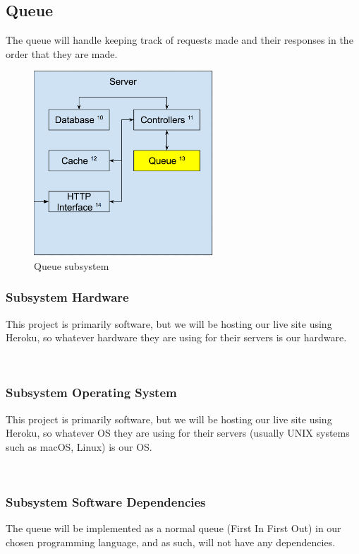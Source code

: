 \subsection{Queue}
The queue will handle keeping track of requests made and their responses in the order that they are made.

\begin{figure}[h!]
	\centering
 	\includegraphics[width=0.60\textwidth]{images/server/server_queue.png}
 	\caption{Queue subsystem}
\end{figure}

\newpage

\subsubsection{Subsystem Hardware}
This project is primarily software, but we will be hosting our live site using Heroku, so whatever hardware they are using for their servers is our hardware.

\\
\subsubsection{Subsystem Operating System}
This project is primarily software, but we will be hosting our live site using Heroku, so whatever OS they are using for their servers (usually UNIX systems such as macOS, Linux) is our OS.

\\
\subsubsection{Subsystem Software Dependencies}
The queue will be implemented as a normal queue (First In First Out) in our chosen programming language, and as such, will not have any dependencies.

